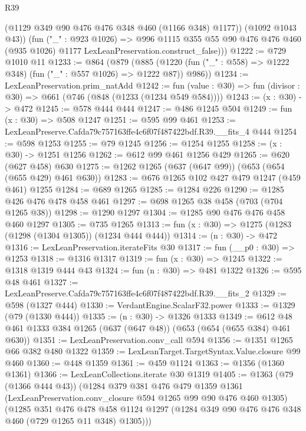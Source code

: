 \begin{lexlean}{R39}
\begin{coremodule}
            (@1129 @349 @90 @476 @476 @348 @460 (@1166 @348) @1177))
          (@1092 @1043 @43))
        (fun ("_" : @923 @1026) =>
        @996
          @1115
          @355
          @55
          @90
          @476
          @476
          @460
          (@935 @1026)
          @1177
          LexLeanPreservation.construct_false)))
@1222 := @729 @1010 @11
@1233 := @864
    (@879
      (@885 (@1220 (fun ("_" : @558) => @1222 @348) (fun ("_" : @557 @1026) => @1222 @87)) @986))
@1234 := LexLeanPreservation.prim_natAdd
@1242 := fun (value : @30) => fun (divisor : @30) => @661 (@746 (@848 (@1233 (@1234 @549 @584))))
@1243 := (x : @30) -> @472
@1245 := @578 @444 @444
@1247 := @486 @1245 @504
@1249 := fun (x : @30) => @508 @1247
@1251 := @595 @99 @461
@1253 := LexLeanPreserve.Cafda79c757163ffe4c6f07f487422bdf.R39.__fits_4 @444
@1254 := @598 @1253
@1255 := @79 @1245
@1256 := @1254 @1255
@1258 := (x : @30) -> @1251 @1256
@1262 := @612 @99 @461 @1256 @429
@1265 := @620 (@627 @458) @630
@1275 := @1262 @1265 (@637 (@647 @99)) (@653 (@654 (@655 @429) @461 @630))
@1283 := @676 @1265 @102 @427 @479 @1247 (@459 @461) @1255
@1284 := @689 @1265
@1285 := @1284 @226
@1290 := @1285 @426 @476 @478 @458 @461
@1297 := @698 @1265 @38 @458 (@703 (@704 @1265 @38))
@1298 := @1290 @1297
@1304 := @1285 @90 @476 @476 @458 @460 @1297
@1305 := @735 @1265
@1313 := fun (x : @30) => @1275 (@1283 (@1298 (@1304 @1305)) (@1234 @444 @444))
@1314 := (n : @30) -> @472
@1316 := LexLeanPreservation.iterateFits @30
@1317 := fun (__p0 : @30) => @1253
@1318 := @1316 @1317
@1319 := fun (x : @30) => @1245
@1322 := @1318 @1319 @444 @43
@1324 := fun (n : @30) => @481 @1322
@1326 := @595 @48 @461
@1327 := LexLeanPreserve.Cafda79c757163ffe4c6f07f487422bdf.R39.__fits_2
@1329 := @598 (@1327 @444)
@1330 := VerdantEngine.ScalarF32.power
@1333 := @1329 (@79 (@1330 @444))
@1335 := (n : @30) -> @1326 @1333
@1349 := @612 @48 @461 @1333 @384 @1265 (@637 (@647 @48)) (@653 (@654 (@655 @384) @461 @630))
@1351 := LexLeanPreservation.conv_call @594
@1356 := @1351 @1265 @66 @382 @480 @1322
@1359 := LexLeanTarget.TargetSyntax.Value.closure @99 @460
@1360 := @448 @1359
@1361 := @459 @1124
@1363 := @1356 (@1360 @1361)
@1366 := LexLeanCollections.iterate @30 @1319
@1405 := @1363
    (@79 (@1366 @444 @43))
    (@1284
      @379
      @381
      @476
      @479
      @1359
      @1361
      (LexLeanPreservation.conv_closure @594 @1265 @99 @90 @476 @460 @1305)
      (@1285
        @351
        @476
        @478
        @458
        @1124
        @1297
        (@1284 @349 @90 @476 @476 @348 @460 (@729 @1265 @11 @348) @1305)))

\end{coremodule}
\end{lexlean}
